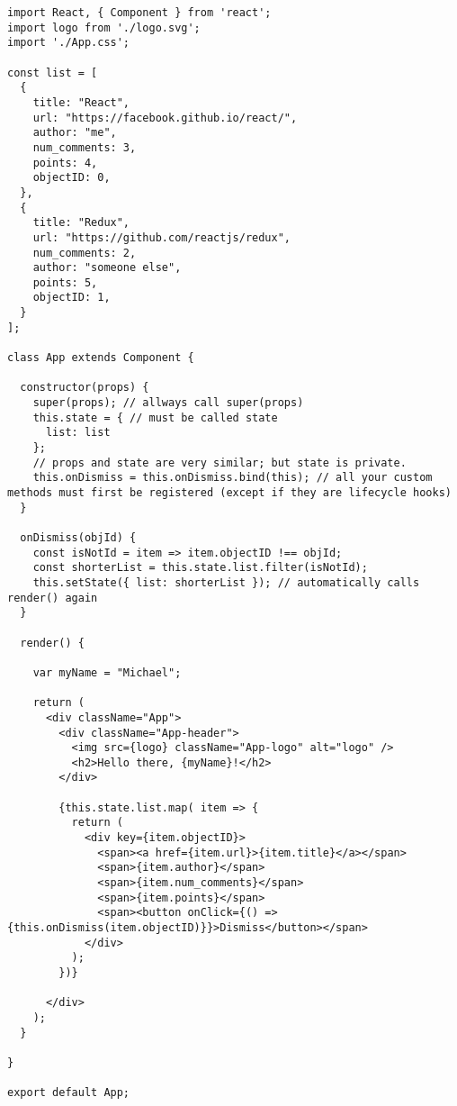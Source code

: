 \begin{lstlisting}
import React, { Component } from 'react';
import logo from './logo.svg';
import './App.css';

const list = [
  {
    title: "React",
    url: "https://facebook.github.io/react/",
    author: "me",
    num_comments: 3,
    points: 4,
    objectID: 0,
  },
  {
    title: "Redux",
    url: "https://github.com/reactjs/redux",
    num_comments: 2,
    author: "someone else",
    points: 5,
    objectID: 1,
  }
];

class App extends Component {

  constructor(props) {
    super(props); // allways call super(props)
    this.state = { // must be called state
      list: list
    };
    // props and state are very similar; but state is private.
    this.onDismiss = this.onDismiss.bind(this); // all your custom methods must first be registered (except if they are lifecycle hooks)
  }

  onDismiss(objId) {
    const isNotId = item => item.objectID !== objId;
    const shorterList = this.state.list.filter(isNotId);
    this.setState({ list: shorterList }); // automatically calls render() again
  }

  render() {

    var myName = "Michael";

    return (
      <div className="App">
        <div className="App-header">
          <img src={logo} className="App-logo" alt="logo" />
          <h2>Hello there, {myName}!</h2>
        </div>

        {this.state.list.map( item => {
          return (
            <div key={item.objectID}>
              <span><a href={item.url}>{item.title}</a></span>
              <span>{item.author}</span>
              <span>{item.num_comments}</span>
              <span>{item.points}</span>
              <span><button onClick={() => {this.onDismiss(item.objectID)}}>Dismiss</button></span>
            </div>
          );
        })}

      </div>
    );
  }

}

export default App;

\end{lstlisting}